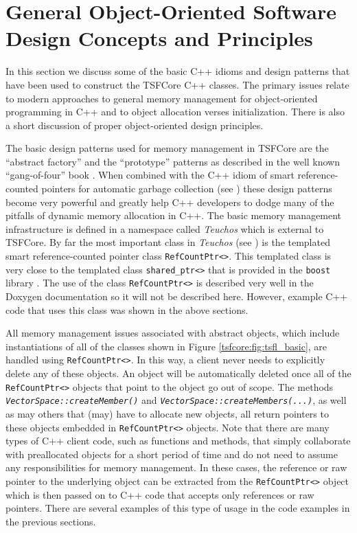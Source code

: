 %
\section{General Object-Oriented Software Design Concepts and Principles}
\label{tsfcore:sec:general_software_concepts}
%
 
In this section we discuss some of the basic C++ idioms and design
patterns that have been used to construct the TSFCore C++ classes.  The
primary issues relate to modern approaches to general memory
management for object-oriented programming in C++ and to object
allocation verses initialization.  There is also a short discussion of
proper object-oriented design principles.

The basic design patterns used for memory management in TSFCore are the
``abstract factory'' and the ``prototype'' patterns as described in
the well known ``gang-of-four'' book \cite{ref:gama_et_al_1995}.  When
combined with the C++ idiom of smart reference-counted pointers for
automatic garbage collection (see \cite[Items 28-29]{ref:meyers_1996})
these design patterns become very powerful and greatly help C++
developers to dodge many of the pitfalls of dynamic memory allocation
in C++.  The basic memory management infrastructure is defined in a
namespace called \textit{Teuchos} which is external to TSFCore.  By
far the most important class in \textit{Teuchos} (see
\cite{ref:moochodevguide}) is the templated smart reference-counted pointer class
\texttt{RefCountPtr<>}.  This templated class is very close to the
templated class \texttt{shared\_ptr<>} that is provided in the
\texttt{boost} library \cite{ref:boost}.  The use of the class
\texttt{RefCountPtr<>} is described very well in the Doxygen
documentation so it will not be described here.  However, example C++
code that uses this class was shown in the above sections.

All memory management issues associated with abstract objects, which
include instantiations of all of the classes shown in Figure
\ref{tsfcore:fig:tsfl_basic}, are handled using
\texttt{RefCountPtr<>}.  In this way, a client never needs to
explicitly delete any of these objects.  An object will be
automatically deleted once all of the
\texttt{RefCountPtr<>} objects that point to the object go out of
scope.  The methods
\texttt{\textit{VectorSpace\-::createMember()}} and
\texttt{\textit{VectorSpace\-::createMembers(...)}}, as well as may others that
(may) have to allocate new objects, all return pointers to these
objects embedded in \texttt{RefCountPtr<>} objects.  Note that
there are many types of C++ client code, such as functions and
methods, that simply collaborate with preallocated objects for a short
period of time and do not need to assume any responsibilities for
memory management.  In these cases, the reference or raw pointer to the
underlying object can be extracted from the
\texttt{RefCountPtr<>} object which is then passed on to C++ code
that accepts only references or raw pointers.  There are several
examples of this type of usage in the code examples in the previous
sections.

